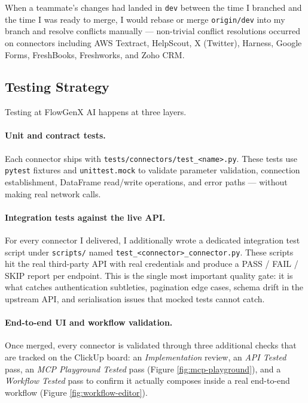 When a teammate's changes had landed in \texttt{dev} between the time
I branched and the time I was ready to merge, I would rebase or
merge \texttt{origin/dev} into my branch and resolve conflicts
manually --- non-trivial conflict resolutions occurred on connectors
including AWS Textract, HelpScout, X (Twitter), Harness, Google Forms,
FreshBooks, Freshworks, and Zoho CRM.

\subsection{Testing Strategy}
Testing at FlowGenX AI happens at three layers.

\paragraph{Unit and contract tests.}
Each connector ships with \texttt{tests/connectors/test\_<name>.py}.
These tests use \texttt{pytest} fixtures and \texttt{unittest.mock}
to validate parameter validation, connection establishment,
DataFrame read/write operations, and error paths --- without making
real network calls.

\paragraph{Integration tests against the live API.}
For every connector I delivered, I additionally wrote a dedicated
integration test script under \texttt{scripts/} named
\texttt{test\_<connector>\_connector.py}. These scripts hit the
real third-party API with real credentials and produce a
\textsc{PASS} / \textsc{FAIL} / \textsc{SKIP} report per endpoint.
This is the single most important quality gate: it is what catches
authentication subtleties, pagination edge cases, schema drift in
the upstream API, and serialisation issues that mocked tests cannot
catch.

\paragraph{End-to-end UI and workflow validation.}
Once merged, every connector is validated through three additional
checks that are tracked on the ClickUp board: an
\emph{Implementation} review, an \emph{API Tested} pass, an
\emph{MCP Playground Tested} pass (Figure
\ref{fig:mcp-playground}), and a \emph{Workflow Tested} pass to
confirm it actually composes inside a real end-to-end workflow
(Figure \ref{fig:workflow-editor}).


